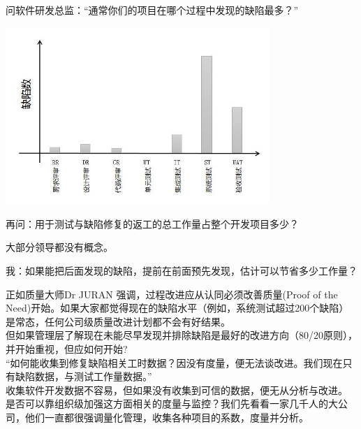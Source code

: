 问软件研发总监：``通常你们的项目在哪个过程中发现的缺陷最多？''

\begin{description}
\item[]
\end{description}


\includegraphics[width=10cm]{AR1缺陷数.jpg}

再问：用于测试与缺陷修复的返工的总工作量占整个开发项目多少？

大部分领导都没有概念。

我：如果能把后面发现的缺陷，提前在前面预先发现，估计可以节省多少工作量？


正如质量大师Dr JURAN 强调，过程改进应从认同必须改善质量(Proof of the
Need)开始。如果大家都觉得现在的缺陷水平（例如，系统测试超过200个缺陷）是常态，任何公司级质量改进计划都不会有好结果。\\
但如果管理层了解现在未能尽早发现并排除缺陷是最好的改进方向（80/20原则），并开始重视，但应如何开始?\\
``如何能收集到修复缺陷相关工时数据？因没有度量，便无法谈改进。我们现在只有缺陷数据，与测试工作量数据。''\\
收集软件开发数据不容易，但如果没有收集到可信的数据，便无从分析与改进。\\
是否可以靠组织级加强这方面相关的度量与监控？我们先看看一家几千人的大公司，他们一直都很强调量化管理，收集各种项目的系数，度量并分析。\\

